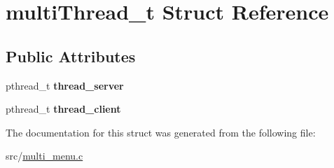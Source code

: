 \hypertarget{structmulti_thread__t}{}\section{multi\+Thread\+\_\+t Struct Reference}
\label{structmulti_thread__t}
\subsection*{Public Attributes}
\begin{DoxyCompactItemize}
\item 
\mbox{\label{structmulti_thread__t_aebc630416d77930606bb55f9a756b99f}} 
pthread\+\_\+t {\bfseries thread\+\_\+server}
\item 
\mbox{\label{structmulti_thread__t_a5f3ed08e49595db9f4f1975e5e4dbe14}} 
pthread\+\_\+t {\bfseries thread\+\_\+client}
\end{DoxyCompactItemize}


The documentation for this struct was generated from the following file\+:\begin{DoxyCompactItemize}
\item 
src/\hyperlink{multi__menu_8c}{multi\+\_\+menu.\+c}\end{DoxyCompactItemize}
